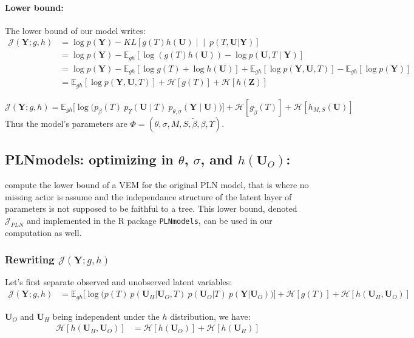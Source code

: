 \documentclass[11pt,a4paper]{article}
\newcommand{\entr}{\mathcal{H}}
\newcommand{\Ybf}{\boldsymbol{Y}}
\newcommand{\Zbf}{\boldsymbol{Z}}
\newcommand{\Ubf}{\boldsymbol{U}}
\newcommand{\Esp}{\mathds{E}}
\begin{document}
\paragraph{Lower bound:}
The lower bound of our model writes:
\begin{align*}
\mathcal{J}(\Ybf; g,h)&=\log p(\Ybf) - KL\left[g(T) h(\Ubf) \middle\vert\middle\vert\ p(T,\Ubf | \Ybf)\right]\\
&= \log p(\Ybf) - \Esp_{gh}[\log( g(T) h(\Ubf)) - \log p(\Ubf,T\mid \Ybf) ]\\
&= \log p(\Ybf) - \Esp_{gh}[\log g(T) + \log h(\Ubf) ] + \Esp_{gh}[\log p(\Ybf,\Ubf,T)] - \Esp_{gh}[\log p(\Ybf)]\\
&= \Esp_{gh} [\log p(\Ybf,\Ubf,T)] + \entr[g(T)] + \entr[h(\Zbf)]
\end{align*}

\begin{equation}
\label{firstJ}
 \boxed{\mathcal{J}(\Ybf; g,h) = \Esp_{gh} \Big[\log \big(p_\beta(T)\:p_{\Upsilon}(\Ubf\mid T)\:p_{\theta, \sigma}(\Ybf\mid \Ubf)\big)\Big] + \entr[g_{\widetilde{\beta}}(T)] + \entr[h_{M,S}(\Ubf)]}
\end{equation}
Thus the model's parameters are $\Phi = (\theta,\sigma,M,S,\widetilde{\beta}, \beta,  \Upsilon)$.

\subsection{PLNmodels: optimizing in $\theta$, $\sigma$, and $h(\Ubf_O)$:}
\citet{CMR18} compute the lower bound of a VEM for the original PLN model, that is where no missing actor is assume and the independance structure of the latent layer of parameters is not supposed to be faithful to a tree. This lower bound, denoted $\mathcal{J}_{PLN}$  and implemented  in the R package \texttt{PLNmodels}, can be used in our computation as well.

\subsubsection{Rewriting  $\mathcal{J}(\Ybf; g,h)$}
Let's first separate observed and unobserved latent variables:
\begin{align*}
\mathcal{J}(\Ybf; g,h)&= \Esp_{gh}\Big[\log \big(p(T)\:  p(\Ubf_H| \Ubf_O,T)\: p(\Ubf_O|T)\:p(\Ybf|\Ubf_O)\big)\Big] + \entr[g(T)] +\entr[h(\Ubf_H,\Ubf_O)]
\end{align*}

 $\Ubf_O$ and $\Ubf_H$ being independent under the $h$ distribution, we have:
\begin{align*}
\entr[h(\Ubf_H,\Ubf_O)] &=\entr[h(\Ubf_O)] +\entr[h(\Ubf_H)]
\end{align*}
\end{document}
